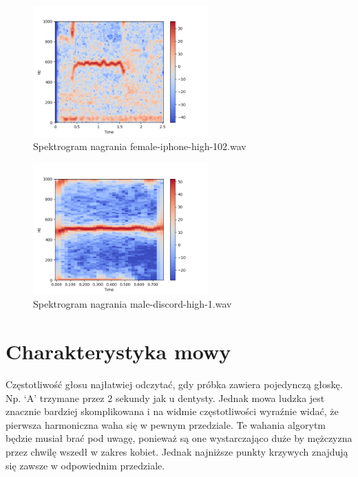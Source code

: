 \documentclass[a4paper,12pt]{extarticle}
\begin{document}
\begin{figure}[ht]
\centering
\includegraphics[width=0.6\textwidth]{5_female-iphone-high-102.png}
\caption{ Spektrogram nagrania female-iphone-high-102.wav}
\end{figure}

\begin{figure}[ht]
\centering
\includegraphics[width=0.6\textwidth]{5_male-discord-high-1.png}
\caption{ Spektrogram nagrania male-discord-high-1.wav}
\end{figure}

\newpage

\section*{Charakterystyka mowy}

Częstotliwość głosu najłatwiej odczytać, gdy próbka zawiera pojedynczą głoskę. Np. ‘A’ trzymane przez 2 sekundy jak u dentysty. Jednak mowa ludzka jest znacznie bardziej skomplikowana i na widmie częstotliwości wyraźnie widać, że pierwsza harmoniczna waha się w pewnym przedziale. Te wahania algorytm będzie musiał brać pod uwagę, ponieważ są one wystarczająco duże by mężczyzna przez chwilę wszedł w zakres kobiet. Jednak najniższe punkty krzywych znajdują się zawsze w odpowiednim przedziale.
\end{document}
